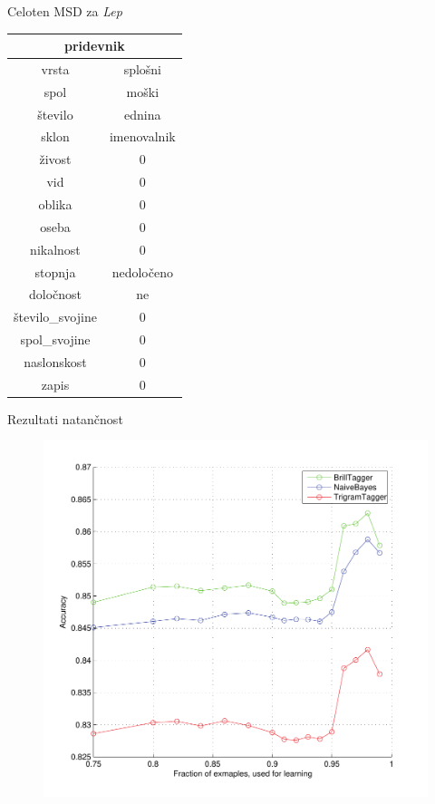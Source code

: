 \documentclass{beamer}
\begin{document}
\begin{frame}{Celoten MSD za \textit{Lep} }
\begin{center}
\begin{tabular}{c|c}
\multicolumn{2}{c}{pridevnik}\\\hline\hline
vrsta & splošni \\
spol & moški \\
število & ednina \\
sklon & imenovalnik \\
živost & 0 \\
vid & 0 \\
oblika & 0 \\
oseba & 0 \\
nikalnost & 0 \\
stopnja & nedoločeno \\
določnost & ne \\
število\_svojine & 0 \\
spol\_svojine & 0 \\
naslonskost & 0 \\
zapis & 0 \\
\end{tabular}
\end{center}
\end{frame}

\begin{frame}{Rezultati natančnost}
\begin{figure}[h]
\begin{center}
\includegraphics[height=0.85\textheight]{../evaluation/graph.pdf} 
\end{center}
\end{figure}
\end{frame}
\end{document}
